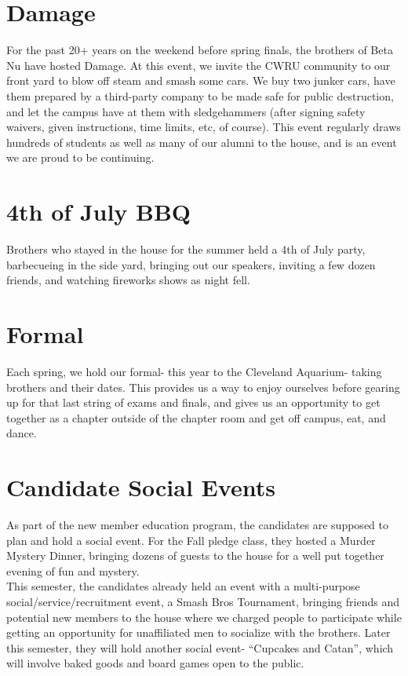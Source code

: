   \section*{Damage}
    For the past 20+ years on the weekend before spring finals, the brothers of Beta Nu have hosted Damage. At this event, we invite the CWRU community to our front yard to blow off steam and smash some cars. We buy two junker cars, have them prepared by a third-party company to be made safe for public destruction, and let the campus have at them with sledgehammers (after signing safety waivers, given instructions, time limits, etc, of course). This event regularly draws hundreds of students as well as many of our alumni to the house, and is an event we are proud to be continuing.
  
  \section*{4th of July BBQ}
    Brothers who stayed in the house for the summer held a 4th of July party, barbecueing in the side yard, bringing out our speakers, inviting a few dozen friends, and watching fireworks shows as night fell.
  
  \section*{Formal}
    Each spring, we hold our formal- this year to the Cleveland Aquarium- taking brothers and their dates. This provides us a way to enjoy ourselves before gearing up for that last string of exams and finals, and gives us an opportunity to get together as a chapter outside of the chapter room and get off campus, eat, and dance.
      
  \section*{Candidate Social Events}
    As part of the new member education program, the candidates are supposed to plan and hold a social event. For the Fall pledge class, they hosted a Murder Mystery Dinner, bringing dozens of guests to the house for a well put together evening of fun and mystery. \\
    
    This semester, the candidates already held an event with a multi-purpose social/service/recruitment event, a Smash Bros Tournament, bringing friends and potential new members to the house where we charged people to participate while getting an opportunity for unaffiliated men to socialize with the brothers. Later this semester, they will hold another social event- ``Cupcakes and Catan'', which will involve baked goods and board games open to the public.
